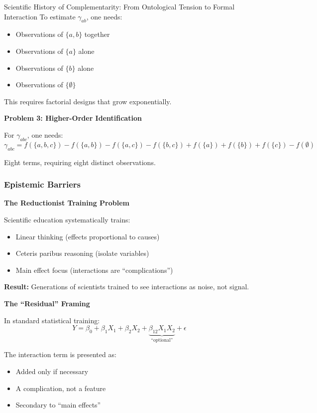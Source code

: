 \begin{chapter}{Scientific History of Complementarity: From Ontological Tension to Formal Interaction}
To estimate $\gamma_{ab}$, one needs:
\begin{itemize}[noitemsep]
    \item Observations of $\{a,b\}$ together
    \item Observations of $\{a\}$ alone
    \item Observations of $\{b\}$ alone
    \item Observations of $\{\emptyset\}$
\end{itemize}

This requires factorial designs that grow exponentially.

\textbf{Problem 3: Higher-Order Identification}

For $\gamma_{abc}$, one needs:
\[
\gamma_{abc} = f(\{a,b,c\}) - f(\{a,b\}) - f(\{a,c\}) - f(\{b,c\}) + f(\{a\}) + f(\{b\}) + f(\{c\}) - f(\emptyset)
\]

Eight terms, requiring eight distinct observations.

\subsubsection{Epistemic Barriers}

\textbf{The Reductionist Training Problem}

Scientific education systematically trains:
\begin{itemize}[noitemsep]
    \item Linear thinking (effects proportional to causes)
    \item Ceteris paribus reasoning (isolate variables)
    \item Main effect focus (interactions are ``complications'')
\end{itemize}

\textbf{Result:} Generations of scientists trained to see interactions as noise, not signal.

\textbf{The ``Residual'' Framing}

In standard statistical training:
\[
Y = \beta_0 + \beta_1 X_1 + \beta_2 X_2 + \underbrace{\beta_{12} X_1 X_2}_{\text{``optional''}} + \epsilon
\]

The interaction term is presented as:
\begin{itemize}[noitemsep]
    \item Added only if necessary
    \item A complication, not a feature
    \item Secondary to ``main effects''
\end{itemize}


\end{chapter}
